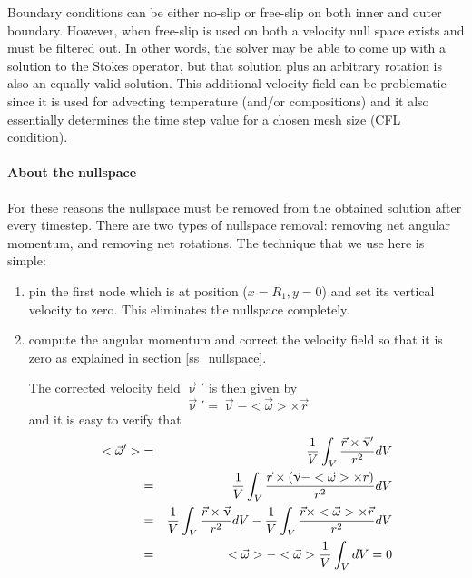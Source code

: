 Boundary conditions can be either no-slip or free-slip on both inner and outer boundary. 
However, when free-slip 
is used on both a velocity null space exists and must be filtered out. In other words,
the solver may be able to come up with a solution to the Stokes operator, but 
that solution plus an arbitrary rotation is also an equally valid solution.
This additional velocity field can be problematic since it is used for 
advecting temperature (and/or compositions)
and it also essentially determines the time step value for a chosen mesh size (CFL condition).

\paragraph{About the nullspace}
For these reasons the nullspace must be removed from the obtained solution after every timestep.
There are two types of nullspace removal: removing net angular momentum, and removing net rotations.
The technique that we use here is simple:
\begin{enumerate}
\item pin the first node which is at position ($x=R_1,y=0$) and set its vertical velocity to zero. This 
eliminates the nullspace completely. 
\item compute the angular momentum and correct the velocity field so that it is zero as explained in section \ref{ss_nullspace}.


The corrected velocity field $\vec{\upnu}'$ is then given by 
\[
\vec{\upnu}' = \vec{\upnu} - <\vec\omega>\times \vec{r}
\]
and it is easy to verify that 
\begin{eqnarray}
<{\vec\omega}'> 
&=& \frac{1}{V} \int_V \frac{{\vec r}\times {\vec\upnu}'}{r^2} dV \nonumber\\
&=& \frac{1}{V} \int_V \frac{{\vec r}\times (\vec{\upnu} - <\vec\omega>\times \vec{r})   }{r^2} dV\nonumber\\
&=& \frac{1}{V} \int_V \frac{{\vec r}\times \vec{\upnu}    }{r^2} dV
- \frac{1}{V} \int_V \frac{{\vec r}\times  <\vec\omega>\times \vec{r}   }{r^2} dV\nonumber\\
&=&  <{\vec\omega}> -  <{\vec\omega}> \frac{1}{V} \int_V dV = 0
\end{eqnarray}

\end{enumerate}



